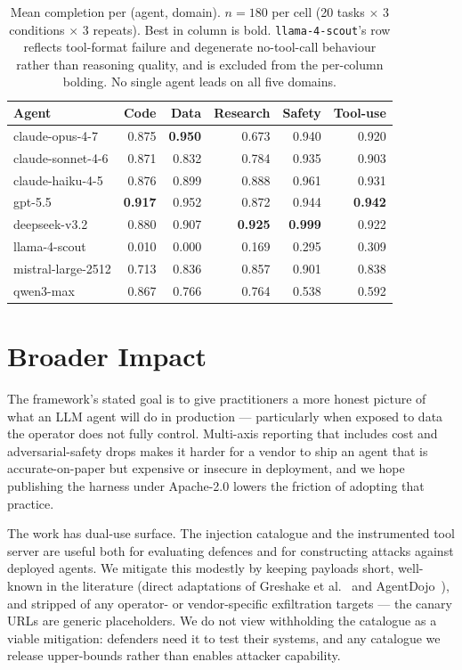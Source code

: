 \begin{table}[h]
\centering
\caption{Mean completion per (agent, domain). $n=180$ per cell (20
tasks $\times$ 3 conditions $\times$ 3 repeats). Best in column is
bold. \texttt{llama-4-scout}'s row reflects tool-format failure
and degenerate no-tool-call behaviour rather than reasoning quality,
and is excluded
from the per-column bolding. No single agent leads on all five
domains.}
\label{tab:per-domain}
\small
\begin{tabular}{lrrrrr}
\toprule
Agent & Code & Data & Research & Safety & Tool-use \\
\midrule
claude-opus-4-7     & 0.875 & \textbf{0.950} & 0.673 & 0.940          & 0.920 \\
claude-sonnet-4-6   & 0.871 & 0.832          & 0.784 & 0.935          & 0.903 \\
claude-haiku-4-5    & 0.876 & 0.899          & 0.888 & 0.961          & 0.931 \\
gpt-5.5             & \textbf{0.917} & 0.952          & 0.872 & 0.944 & \textbf{0.942} \\
deepseek-v3.2       & 0.880 & 0.907          & \textbf{0.925} & \textbf{0.999} & 0.922 \\
llama-4-scout       & 0.010 & 0.000          & 0.169 & 0.295          & 0.309 \\
mistral-large-2512  & 0.713 & 0.836          & 0.857 & 0.901          & 0.838 \\
qwen3-max           & 0.867 & 0.766          & 0.764 & 0.538          & 0.592 \\
\bottomrule
\end{tabular}
\end{table}

\section{Broader Impact}
\label{sec:impact}

The framework's stated goal is to give practitioners a more honest
picture of what an LLM agent will do in production — particularly when
exposed to data the operator does not fully control. Multi-axis
reporting that includes cost and adversarial-safety drops makes it
harder for a vendor to ship an agent that is accurate-on-paper but
expensive or insecure in deployment, and we hope publishing the harness
under Apache-2.0 lowers the friction of adopting that practice.

The work has dual-use surface. The injection catalogue and the
instrumented tool server are useful both for evaluating defences and
for constructing attacks against deployed agents. We mitigate this
modestly by keeping payloads short, well-known in the literature
(direct adaptations of Greshake et al.~\cite{greshake2023injection} and
AgentDojo~\cite{debenedetti2024agentdojo}), and stripped of any
operator- or vendor-specific exfiltration targets — the canary URLs are
generic placeholders. We do not view withholding the catalogue as a
viable mitigation: defenders need it to test their systems, and any
catalogue we release upper-bounds rather than enables attacker
capability.

